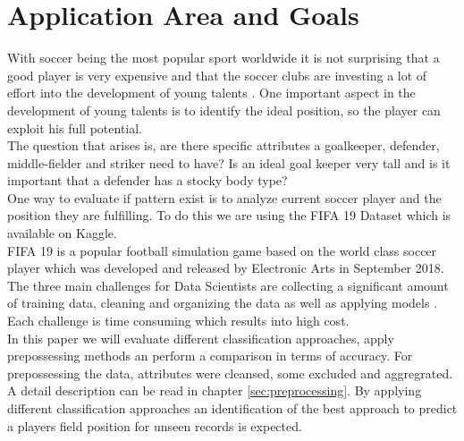 \section{Application Area and Goals}
With soccer being the most popular sport worldwide it is not surprising that a good player is very expensive and that the soccer clubs are investing a lot of effort into the development of young talents \cite{ref_Transfermarkt}. One important aspect in the development of young talents is to identify the ideal position, so the player can exploit his full potential.\\
The question that arises is, are there specific attributes a goalkeeper, defender, middle-fielder and striker need to have? Is an ideal goal keeper very tall and is it important that a defender has a stocky body type?\\
One way to evaluate if pattern exist is to analyze current soccer player and the position they are fulfilling. To do this we are using the FIFA 19 Dataset which is available on Kaggle.\\
FIFA 19 is a popular football simulation game based on the world class soccer player which was developed and released by Electronic Arts in September 2018. 
The three main challenges for Data Scientists are collecting a significant amount of training data, cleaning and organizing the data as well as applying models  \cite{ref_Crowdflower}. Each challenge is time consuming which results into high cost.\\
In this paper we will evaluate different classification approaches, apply prepossessing methods an perform a comparison in terms of accuracy. For prepossessing the data, attributes were cleansed, some excluded and aggregrated. A detail description can be read in chapter \ref{sec:preprocessing}.
By applying different classification approaches an identification of the best approach to predict a players field position for unseen records is expected.

